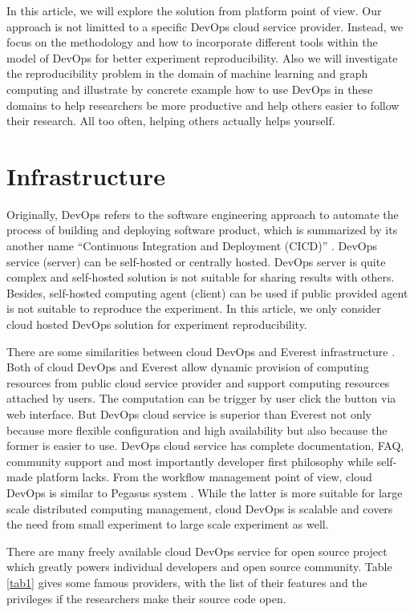\documentclass{IEEEcsmag}
\begin{document}
In this article, we will explore the solution from platform point of view. Our approach is not limitted to a specific DevOps cloud service provider. Instead, we focus on the methodology and how to incorporate different tools within the model of DevOps for better experiment reproducibility. 
Also we will investigate the reproducibility problem in the domain of machine learning and graph computing and illustrate by concrete example how to use DevOps in these domains to help researchers be more productive and help others easier to follow their research. All too often, helping others actually helps yourself.

\section{Infrastructure}
Originally, DevOps refers to the software engineering approach to automate the process of building and deploying software product, which is summarized by its another name ``Continuous Integration and Deployment (CICD)'' \cite{bass2015devops}. 
DevOps service (server) can be self-hosted or centrally hosted. DevOps server is quite complex and self-hosted solution is not suitable for sharing results with others. Besides, self-hosted computing agent (client) can be used if public provided agent is not suitable to reproduce the experiment. In this article, we only consider cloud hosted DevOps solution for experiment reproducibility.

There are some similarities between cloud DevOps and Everest infrastructure \cite{GavishD12} . Both of cloud DevOps and Everest allow dynamic provision of computing resources from public cloud service provider and support computing resources attached by users. The computation can be trigger by user click the button via web interface. But DevOps cloud service is superior than Everest not only because more flexible configuration and high availability but also because the former is easier to use. DevOps cloud service has complete documentation, FAQ, community support and most importantly developer first philosophy while self-made platform lacks.  From the workflow management point of view, cloud DevOps is similar to Pegasus system \cite{Pegasus}. While the latter is more suitable for large scale distributed computing management, cloud DevOps is scalable and covers the need from small experiment to large scale experiment as well.

There are many freely available cloud DevOps service for open source project which greatly powers individual developers and open source community. Table \ref{tab1} gives some famous providers, with the list of their features and the privileges if the researchers make their source code open.
\end{document}
